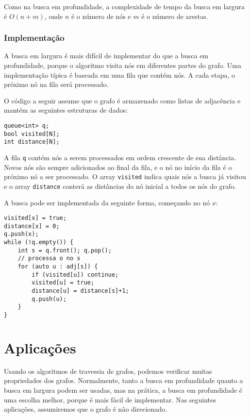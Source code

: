 Como na busca em profundidade, a complexidade de tempo da busca em largura é $O(n+m)$, onde $n$ é o número de nós e $m$ é o número de arestas.

\subsubsection*{Implementação}

A busca em largura é mais difícil de implementar do que a busca em profundidade, porque o algoritmo visita nós em diferentes partes do grafo. Uma implementação típica é baseada em uma fila que contém nós. A cada etapa, o próximo nó na fila será processado.

O código a seguir assume que o grafo é armazenado como listas de adjacência e mantém as seguintes estruturas de dados:

\begin{lstlisting}
queue<int> q;
bool visited[N];
int distance[N];
\end{lstlisting}

A fila \texttt{q} contém nós a serem processados em ordem crescente de sua distância. Novos nós são sempre adicionados ao final da fila, e o nó no início da fila é o próximo nó a ser processado. O array \texttt{visited} indica quais nós a busca já visitou e o array \texttt{distance} conterá as distâncias do nó inicial a todos os nós do grafo.

A busca pode ser implementada da seguinte forma, começando no nó $x$:

\begin{lstlisting}
visited[x] = true;
distance[x] = 0;
q.push(x);
while (!q.empty()) {
    int s = q.front(); q.pop();
    // processa o no s
    for (auto u : adj[s]) {
        if (visited[u]) continue;
        visited[u] = true;
        distance[u] = distance[s]+1;
        q.push(u);
    }
}
\end{lstlisting}

\section{Aplicações}

Usando os algoritmos de travessia de grafos, podemos verificar muitas propriedades dos grafos. Normalmente, tanto a busca em profundidade quanto a busca em largura podem ser usadas, mas na prática, a busca em profundidade é uma escolha melhor, porque é mais fácil de implementar. Nas seguintes aplicações, assumiremos que o grafo é não direcionado.

